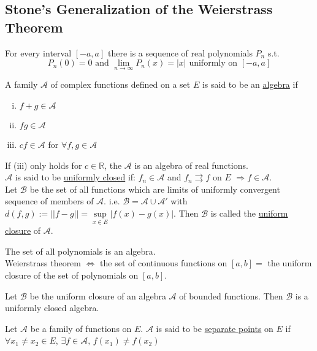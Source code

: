 \subsection{Stone's Generalization of the Weierstrass Theorem}
\begin{corollary}
    For every interval  $ [-a,a] $ there is a sequence of real polynomials  $ P_n  $ s.t. 
    \[P_n(0)=0\text{ and }\lim\limits_{n\to\infty} P_n(x)=|x|\text{ uniformly on }[-a,a] \] 
\end{corollary}
A family  $ \mathscr{A} $ of complex functions defined on a set  $ E  $ is said to be an \underline{algebra} if 
\begin{enumerate}[(i)]
    \item  $ f+g\in\mathscr{A} $
    \item  $ fg\in\mathscr{A} $
    \item  $ cf\in\mathscr{A} $ for  $ \forall f,g\in \mathscr{A } $     
\end{enumerate} 
If (iii) only holds for  $ c\in\mathbb{R } $, the  $ \mathscr{A } $ is an algebra of real functions.\\
 $ \mathscr{A } $ is said to be \underline{uniformly closed} if:  $ f_n\in\mathscr{A } $ and  $ f_n\rightrightarrows f   $ on  $ E  $  $ \Rightarrow f\in \mathscr{A} $.\\
  Let  $  \mathscr {B} $ be the set of all functions which are limits of uniformly convergent sequence of members of  $  \mathscr{A} $. i.e.  $  \mathscr{B }= \mathscr{A}\cup  \mathscr{A}'  $ with  $ d(f,g):=||f-g||=\sup\limits_{x\in E}|f(x)-g(x)| $. Then  $  \mathscr{B } $ is called the \underline{uniform closure} of  $  \mathscr{A } $.
\begin{example}
    The set of all polynomials is an algebra.\\
    Weierstrass theorem $ \Leftrightarrow  $ the set of continuous functions on  $ [a,b]= $ the uniform closure of the set of polynomials on  $ [a,b] $. 
\end{example}  
\begin{theorem}
    Let  $  \mathscr{B }  $ be the uniform closure of an algebra  $  \mathscr{A } $ of bounded functions. Then  $  \mathscr{B } $ is a uniformly closed algebra.
\end{theorem}
Let  $  \mathscr{A } $ be a family of functions on  $ E  $.  $  \mathscr{A } $ is said to be \underline{separate points} on  $ E  $ if $ \forall x_1\not=x_2\in E  $,  $ \exists f\in \mathscr{A},\,f(x_1)\not=f(x_2)$ \\
